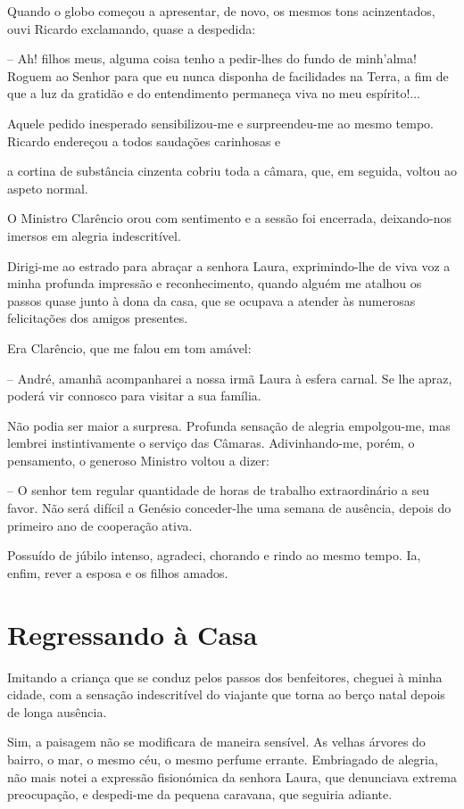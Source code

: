 \documentclass[portuguese,12pt,a4paper]{scrbook}
\begin{document}
	Quando o globo começou a apresentar, de novo, os mesmos tons acinzentados, ouvi Ricardo exclamando, quase a despedida:
	
	– Ah! filhos meus, alguma coisa tenho a pedir-lhes do fundo de minh’alma! Roguem ao Senhor para que eu nunca disponha de facilidades na Terra, a fim de que a luz da gratidão e do entendimento permaneça viva no meu espírito!...
	
	Aquele pedido inesperado sensibilizou-me e surpreendeu-me ao mesmo tempo. Ricardo endereçou a todos saudações carinhosas e
	
	
	a cortina de substância cinzenta cobriu toda a câmara, que, em seguida, voltou ao aspeto normal.
	
	O Ministro Clarêncio orou com sentimento e a sessão foi encerrada, deixando-nos imersos em alegria indescritível.
	
	Dirigi-me ao estrado para abraçar a senhora Laura, exprimindo-lhe de viva voz a minha profunda impressão e reconhecimento, quando alguém me atalhou os passos quase junto à dona da casa, que se ocupava a atender às numerosas felicitações dos amigos presentes.
	
	Era Clarêncio, que me falou em tom amável:
	
	– André, amanhã acompanharei a nossa irmã Laura à esfera carnal. Se lhe apraz, poderá vir connosco para visitar a sua família.
	
	Não podia ser maior a surpresa. Profunda sensação de alegria empolgou-me, mas lembrei instintivamente o serviço das Câmaras. Adivinhando-me, porém, o pensamento, o generoso Ministro voltou a dizer:
	
	– O senhor tem regular quantidade de horas de trabalho extraordinário a seu favor. Não será difícil a Genésio conceder-lhe uma semana de ausência, depois do primeiro ano de cooperação ativa.
	
	Possuído de júbilo intenso, agradeci, chorando e rindo ao mesmo tempo. Ia, enfim, rever a esposa e os filhos amados.
	
	
	\chapter{Regressando à Casa}
	
	Imitando a criança que se conduz pelos passos dos benfeitores, cheguei à minha cidade, com a sensação indescritível do viajante que torna ao berço natal depois de longa ausência.
	
	Sim, a paisagem não se modificara de maneira sensível. As velhas árvores do bairro, o mar, o mesmo céu, o mesmo perfume errante. Embriagado de alegria, não mais notei a expressão fisionómica da senhora Laura, que denunciava extrema preocupação, e despedi-me da pequena caravana, que seguiria adiante.
	
\end{document}

